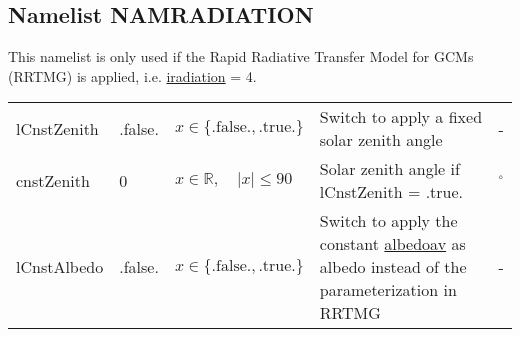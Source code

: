 \documentclass[twoside,11pt,fleqn,a4paper,english,openright]{report}
\begin{document}
\newpage
\subsection{Namelist NAMRADIATION}\label{par:radiation}
This namelist is only used if the Rapid Radiative Transfer Model for GCMs (RRTMG) is applied, i.e.  \hyperlink{iradiation}{iradiation} = 4.
\begin{center}
  \tablelasttail{
        &&&&\\\hline
  }
\begin{supertabular}{|l|p{2cm}|p{4cm}|p{6cm}|l|}
   lCnstZenith	&	.false.	& $x\in\{\text{.false.},\text{.true.}\}$	& Switch to apply a fixed solar zenith angle	& -\\
   cnstZenith	&	0	& $x \in \mathbb{R}, \quad \vert x\vert \leq 90 $	& Solar zenith angle if lCnstZenith = .true.	& $^{\circ}$\\
   lCnstAlbedo	&	.false.	& $x\in\{\text{.false.},\text{.true.}\}$	& Switch to apply the constant \hyperlink{albedo}{albedoav} as albedo instead of the parameterization in RRTMG	& -\\

\end{supertabular}
\end{center}
\end{document}
